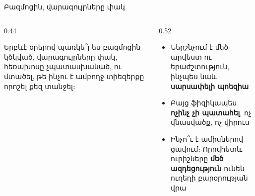 
\begin{frame}{Բազմոցին, վարագույրները փակ}
  \begin{columns}[c]
    \begin{column}{0.44\textwidth}
      \begin{bookquote}
        Երբևէ օրերով պառկե՞լ ես բազմոցին կծկված, վարագույրները փակ, հեռախոսը չպատասխանած, ու մտածել, թե ինչու է ամբողջ տիեզերքը որոշել քեզ տանջել։
      \end{bookquote}
    \end{column}
    \begin{column}{0.52\textwidth}
      \begin{itemize}
        \item Ներշնչում է մեծ արվեստ ու երաժշտություն, ինչպես նաև \textbf{սարսափելի պոեզիա}
        \item<2-> Բայց ֆիզիկապես \textbf{ոչինչ չի պատահել}. ոչ վնասվածք, ոչ վիրուս
        \item<3-> Ինչո՞ւ է ամիսներով ցավում։ Որովհետև ուրիշները \textbf{մեծ ազդեցություն} ունեն ուղեղի բարօրության վրա
      \end{itemize}
    \end{column}
  \end{columns}
\end{frame}

